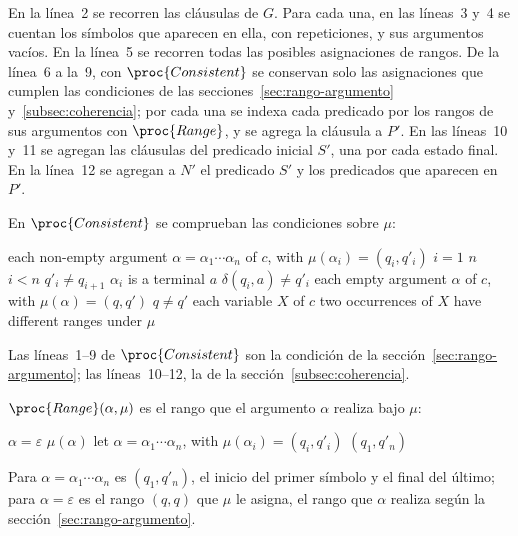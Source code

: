 \documentclass{report}
\theoremstyle{definition}
\theoremstyle{plain}
\theoremstyle{remark}
\begin{document}
En la línea~2 se recorren las cláusulas de $G$. Para cada una, en las
líneas~3 y~4 se cuentan los símbolos que aparecen en ella, con
repeticiones, y sus argumentos vacíos. En la línea~5 se recorren todas
las posibles asignaciones de rangos. De la línea~6 a la~9, con $\proc{Consistent}$ se conservan
solo las asignaciones que cumplen las condiciones de las
secciones~\ref{sec:rango-argumento} y~\ref{subsec:coherencia}; por
cada una se indexa cada predicado por los rangos de sus argumentos con
$\proc{Range}$, y se agrega la cláusula a $P'$. En las líneas~10 y~11 se
agregan las cláusulas del predicado inicial $S'$, una por cada estado
final. En la línea~12 se agregan a $N'$ el
predicado $S'$ y los predicados que aparecen en $P'$.

En $\proc{Consistent}$ se comprueban las condiciones sobre $\mu$:

\begin{codebox}
\li \For each non-empty argument $\alpha = \alpha_1 \cdots \alpha_n$ of $c$, with $\mu(\alpha_i) = (q_i, q'_i)$
\li \Do
        \For $i = 1$ \To $n$
\li     \Do
            \If $i < n$  $q'_i \neq q_{i+1}$
\li         \Then \Return {}
            \End
\li         \If $\alpha_i$ is a terminal $a$  $\delta(q_i, a) \neq q'_i$
\li         \Then \Return {}
            \End
        \End
    \End
\li \For each empty argument $\alpha$ of $c$, with $\mu(\alpha) = (q, q')$
\li \Do
        \If $q \neq q'$
\li     \Then \Return {}
        \End
    \End
\li \For each variable $X$ of $c$
\li \Do
        \If two occurrences of $X$ have different ranges under $\mu$
\li     \Then \Return {}
        \End
    \End
\li \Return {}
\end{codebox}

Las líneas~1--9 de $\proc{Consistent}$ son la condición de la
sección~\ref{sec:rango-argumento}; las líneas~10--12, la de la
sección~\ref{subsec:coherencia}.

$\proc{Range}(\alpha, \mu)$ es el rango que el argumento $\alpha$
realiza bajo $\mu$:

\begin{codebox}
\li \If $\alpha = \varepsilon$
\li \Then \Return $\mu(\alpha)$
    \End
\li let $\alpha = \alpha_1 \cdots \alpha_n$, with $\mu(\alpha_i) = (q_i, q'_i)$
\li \Return $(q_1, q'_n)$
\end{codebox}

Para $\alpha = \alpha_1 \cdots \alpha_n$ es $(q_1, q'_n)$, el inicio del
primer símbolo y el final del último; para $\alpha = \varepsilon$ es el
rango $(q, q)$ que $\mu$ le asigna, el rango que $\alpha$ realiza según
la sección~\ref{sec:rango-argumento}.
\end{document}
